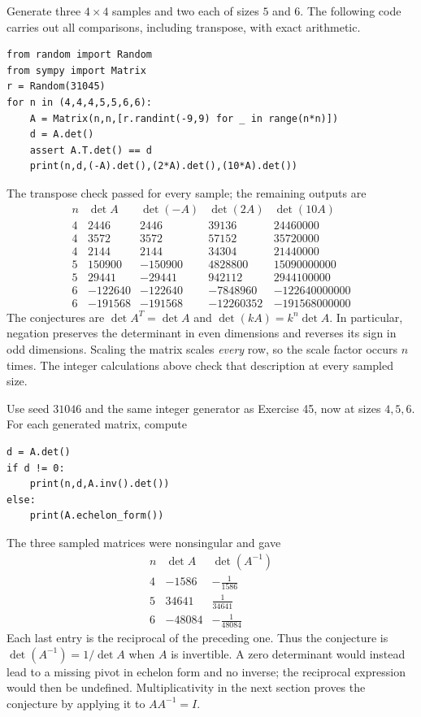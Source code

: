 Generate three $4\times4$ samples and two each of sizes $5$ and $6$. The following code carries out all comparisons, including transpose, with exact arithmetic.
\begin{verbatim}
from random import Random
from sympy import Matrix
r = Random(31045)
for n in (4,4,4,5,5,6,6):
    A = Matrix(n,n,[r.randint(-9,9) for _ in range(n*n)])
    d = A.det()
    assert A.T.det() == d
    print(n,d,(-A).det(),(2*A).det(),(10*A).det())
\end{verbatim}
The transpose check passed for every sample; the remaining outputs are
\[\begin{array}{r|rrrr}n&\det A&\det(-A)&\det(2A)&\det(10A)\\\hline
4&2446&2446&39136&24460000\\4&3572&3572&57152&35720000\\4&2144&2144&34304&21440000\\5&150900&-150900&4828800&15090000000\\5&29441&-29441&942112&2944100000\\6&-122640&-122640&-7848960&-122640000000\\6&-191568&-191568&-12260352&-191568000000\end{array}\]
The conjectures are $\det A^T=\det A$ and $\det(kA)=k^n\det A$. In particular, negation preserves the determinant in even dimensions and reverses its sign in odd dimensions. Scaling the matrix scales \emph{every} row, so the scale factor occurs $n$ times. The integer calculations above check that description at every sampled size.

Use seed $31046$ and the same integer generator as Exercise 45, now at sizes $4,5,6$. For each generated matrix, compute
\begin{verbatim}
d = A.det()
if d != 0:
    print(n,d,A.inv().det())
else:
    print(A.echelon_form())
\end{verbatim}
The three sampled matrices were nonsingular and gave
\[\begin{array}{r|rr}n&\det A&\det(A^{-1})\\\hline
4&-1586&- \frac{1}{1586}\\5&34641&\frac{1}{34641}\\6&-48084&- \frac{1}{48084}\end{array}\]
Each last entry is the reciprocal of the preceding one. Thus the conjecture is $\det(A^{-1})=1/\det A$ when $A$ is invertible. A zero determinant would instead lead to a missing pivot in echelon form and no inverse; the reciprocal expression would then be undefined. Multiplicativity in the next section proves the conjecture by applying it to $AA^{-1}=I$.
